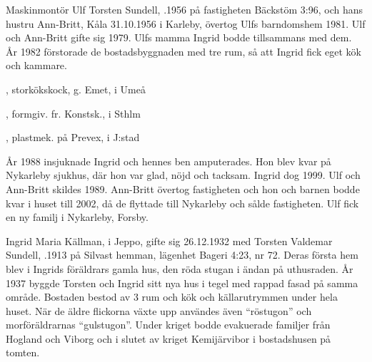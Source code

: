 Maskinmontör Ulf Torsten Sundell, .1956 på fastigheten Bäckstöm 3:96, och hans hustru Ann-Britt, \textborn Kåla 31.10.1956 i Karleby, övertog Ulfs barndomshem 1981. Ulf och Ann-Britt gifte sig 1979. Ulfs mamma Ingrid bodde tillsammans med dem. År 1982 förstorade de bostadsbyggnaden med tre rum, så att Ingrid fick eget kök och kammare.
\begin{jhchildren}
  \item {}, storkökskock, g. Emet, i Umeå
  \item {}, formgiv. fr. Konstsk., i Sthlm
  \item {}, plastmek. på Prevex, i J:stad
\end{jhchildren}

År 1988 insjuknade Ingrid och hennes ben amputerades. Hon blev kvar på Nykarleby sjukhus, där hon var glad, nöjd och tacksam. Ingrid dog 	1999. Ulf och Ann-Britt skildes 1989. Ann-Britt övertog fastigheten och	hon och barnen bodde kvar i huset till 2002, då de flyttade till Nykarleby och sålde fastigheten. Ulf fick en ny familj i Nykarleby, Forsby.


\jhvspace{}


Ingrid Maria Källman,  i Jeppo, gifte sig 26.12.1932 med Torsten Valdemar Sundell, .1913 på Silvast hemman, 	lägenhet Bageri 4:23, nr 72. Deras första hem blev i Ingrids föräldrars gamla hus, den röda stugan i ändan på uthusraden. År 1937 byggde 	Torsten och Ingrid sitt nya hus i tegel med rappad fasad på samma område. Bostaden bestod av 3 rum och kök och källarutrymmen under hela huset. När de äldre flickorna växte upp användes även ``röstugon'' och morföräldrarnas ``gulstugon''. Under kriget bodde evakuerade 	familjer från Hogland och Viborg och i slutet av kriget Kemijärvibor i 	bostadshusen på tomten.
\begin{jhchildren}
  \item {}
  \item {}
  \item {}
  \item {}
  \item {}
  \item {}
  \item {}
\end{jhchildren}

